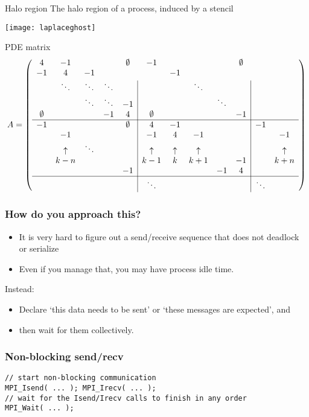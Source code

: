 \begin{frame}{Halo region}
  The halo region of a process, induced by a stencil

  \texttt{[image: laplaceghost]}
\end{frame}

\begin{frame}{PDE matrix}
  \footnotesize
  \[
    A=
    \left(\begin{array}{ccccc|ccccc|cc}
      4&-1&&&\emptyset&-1&&&&\emptyset&\\ 
      -1&4&-1&&&&-1&&&&\\ 
      &\ddots&\ddots&\ddots&&&&\ddots&&\\ 
      &&\ddots&\ddots&-1&&&&\ddots&\\ 
      \emptyset&&&-1&4&\emptyset&&&&-1&\\ \hline
      -1&&&&\emptyset&4&-1&&&&-1\\
      &-1      &      &&&-1      &4       &-1      &&&&-1\\
      &\uparrow&\ddots&&&\uparrow&\uparrow&\uparrow&&  &&\uparrow\\
      &k-n     &      &&&k-1     &k       &k+1     &&-1&&k+n\\
      &&&&-1&&&&-1&4&&\\ \hline
      &        &      &&&\ddots  &        &        &&  &\ddots\\
    \end{array}\right)
    \]
\end{frame}

\begin{frame}[containsverbatim]\frametitle{How do you approach this?}
  \begin{itemize}
  \item It is very hard to figure out a send/receive sequence that
    does not deadlock or serialize
  \item Even if you manage that, you may have process idle time.
  \end{itemize}
  Instead: 
  \begin{itemize}
  \item Declare `this data needs to be sent' or `these messages are expected', and
  \item then wait for them collectively.
  \end{itemize}
\end{frame}

\begin{frame}[containsverbatim]\frametitle{Non-blocking send/recv}
\lstset{language=C}
\begin{lstlisting}
// start non-blocking communication
MPI_Isend( ... ); MPI_Irecv( ... );
// wait for the Isend/Irecv calls to finish in any order
MPI_Wait( ... );  
\end{lstlisting}
\end{frame}

